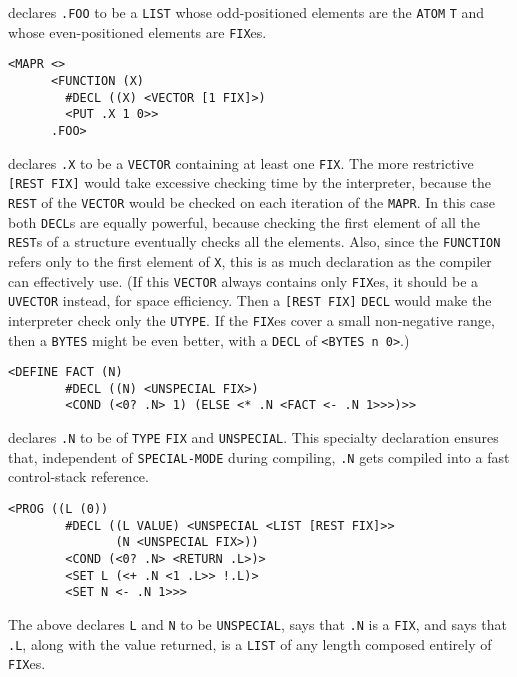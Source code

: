 \documentclass[a4paper,]{article}
\begin{document}
declares \texttt{.FOO} to be a \texttt{LIST} whose odd-positioned elements are the \texttt{ATOM} \texttt{T} and whose
even-positioned elements are \texttt{FIX}es.

\begin{verbatim}
<MAPR <>
      <FUNCTION (X)
        #DECL ((X) <VECTOR [1 FIX]>)
        <PUT .X 1 0>>
      .FOO>
\end{verbatim}

declares \texttt{.X} to be a \texttt{VECTOR} containing at least one \texttt{FIX}. The more restrictive
\texttt{{[}REST\ FIX{]}} would take excessive checking time by the interpreter, because the \texttt{REST} of the
\texttt{VECTOR} would be checked on each iteration of the \texttt{MAPR}. In this case both \texttt{DECL}s are equally
powerful, because checking the first element of all the \texttt{REST}s of a structure eventually checks all the elements.
Also, since the \texttt{FUNCTION} refers only to the first element of \texttt{X}, this is as much declaration as the
compiler can effectively use. (If this \texttt{VECTOR} always contains only \texttt{FIX}es, it should be a \texttt{UVECTOR}
instead, for space efficiency. Then a \texttt{{[}REST\ FIX{]}} \texttt{DECL} would make the interpreter check only the
\texttt{UTYPE}. If the \texttt{FIX}es cover a small non-negative range, then a \texttt{BYTES} might be even better, with a
\texttt{DECL} of \texttt{\textless{}BYTES\ n\ 0\textgreater{}}.)

\begin{verbatim}
<DEFINE FACT (N)
        #DECL ((N) <UNSPECIAL FIX>)
        <COND (<0? .N> 1) (ELSE <* .N <FACT <- .N 1>>>)>>
\end{verbatim}

declares \texttt{.N} to be of \texttt{TYPE} \texttt{FIX} and \texttt{UNSPECIAL}. This specialty declaration ensures that,
independent of \texttt{SPECIAL-MODE} during compiling, \texttt{.N} gets compiled into a fast control-stack reference.

\begin{verbatim}
<PROG ((L (0))
        #DECL ((L VALUE) <UNSPECIAL <LIST [REST FIX]>>
               (N <UNSPECIAL FIX>))
        <COND (<0? .N> <RETURN .L>)>
        <SET L (<+ .N <1 .L>> !.L)>
        <SET N <- .N 1>>>
\end{verbatim}

The above declares \texttt{L} and \texttt{N} to be \texttt{UNSPECIAL}, says that \texttt{.N} is a \texttt{FIX}, and says
that \texttt{.L}, along with the value returned, is a \texttt{LIST} of any length composed entirely of \texttt{FIX}es.
\end{document}
